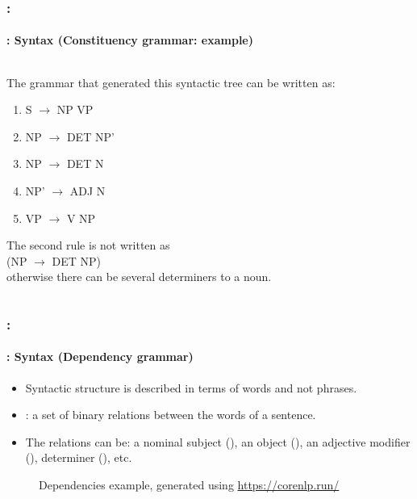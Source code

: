 \documentclass[xcolor=table]{beamer}
\begin{document}
\begin{frame}
	\frametitle{\insertshortsubtitle: \insertsection}
	\framesubtitle{\insertsubsection: Syntax (Constituency grammar: example)}

	\begin{columns}
		\begin{column}{0.52\textwidth}
		The grammar that generated this syntactic tree can be written as: 
		
		\begin{enumerate}
			\item S $ \rightarrow $ NP VP
			\item NP $ \rightarrow $ DET NP'
			\item NP $ \rightarrow $ DET N
			\item NP' $ \rightarrow $ ADJ N
			\item VP $ \rightarrow $ V NP
		\end{enumerate}
	
		The second rule is not written as \\(NP $ \rightarrow $ DET NP)\\ 
		otherwise there can be several determiners to a noun.
		
		\end{column}
		\begin{column}{0.42\textwidth}
		\end{column}%
	\end{columns}

\end{frame}

\begin{frame}
	\frametitle{\insertshortsubtitle: \insertsection}
	\framesubtitle{\insertsubsection: Syntax (Dependency grammar)}

	\begin{itemize}
		\item Syntactic structure is described in terms of words and not phrases.
		\item {}: a set of binary relations between the words of a sentence.
		\item The relations can be: a nominal subject (), an object (), an adjective modifier (), determiner (), etc.
	\end{itemize}
	
	\begin{figure}
		\centering
		\caption{Dependencies example, generated using \url{https://corenlp.run/}}
	\end{figure}

\end{frame}
\end{document}
